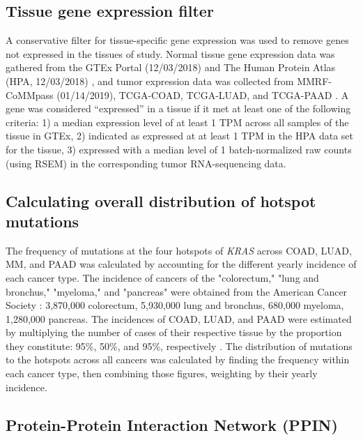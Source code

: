 \documentclass[english, 10pt, letterpaper]{article}
\newcommand{\KRAS}{\emph{KRAS}}
\begin{document}
\subsection*{Tissue gene expression filter}

A conservative filter for tissue-specific gene expression was used to remove genes not expressed in the tissues of study. 
Normal tissue gene expression data was gathered from the GTEx Portal (12/03/2018) \cite{GTExConsortium2017} and The Human Protein Atlas (HPA, 12/03/2018) \cite{Uhlen2015, Uhlen2016}, and tumor expression data was collected from MMRF-CoMMpass (01/14/2019), TCGA-COAD, TCGA-LUAD, and TCGA-PAAD \cite{Walker2019AAnalysis., CancerGenomeAtlasNetwork2012, CancerGenomeAtlasResearchNetwork2014, CancerGenomeAtlasResearchNetwork.Electronicaddress:andrew_aguirredfci.harvard.edu2017}. 
A gene was considered “expressed” in a tissue if it met at least one of the following criteria: 1) a median expression level of at least 1 TPM across all samples of the tissue in GTEx, 2) indicated as expressed at at least 1 TPM in the HPA data set for the tissue, 3) expressed with a median level of 1 batch-normalized raw counts (using RSEM) in the corresponding tumor RNA-sequencing data.


\subsection*{Calculating overall distribution of hotspot mutations}
The frequency of mutations at the four hotspots of \KRAS{} across COAD, LUAD, MM, and PAAD was calculated by accounting for the different yearly incidence of each cancer type.
The incidence of cancers of the "colorectum," "lung and bronchus," "myeloma," and "pancreas" were obtained from the American Cancer Society \cite{Siegel2020Cancer2020.}: 3,870,000 colorectum, 5,930,000 lung and bronchus, 680,000 myeloma, 1,280,000 pancreas.
The incidences of COAD, LUAD, and PAAD were estimated by multiplying the number of cases of their respective tissue by the proportion they constitute: 95\%, 50\%, and 95\%, respectively \cite{Siegel2020Cancer2020., Meza2015Lung1973-2010.}.
The distribution of mutations to the hotspots across all cancers was calculated by finding the frequency within each cancer type, then combining those figures, weighting by their yearly incidence.


\subsection*{Protein-Protein Interaction Network (PPIN)}
\end{document}
